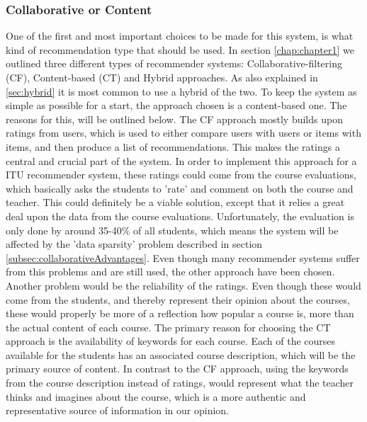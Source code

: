 \subsubsection*{Collaborative or Content}
One of the first and most important choices to be made for this system, is what kind of recommendation type that should be used. In section \ref{chap:chapter1} we outlined three different types of recommender systems: Collaborative-filtering (CF), Content-based (CT) and Hybrid approaches. As also explained in \ref{sec:hybrid} it is most common to use a hybrid of the two. To keep the system as simple as possible for a start, the approach chosen is a content-based one. The reasons for this, will be outlined below. \newline
The CF approach mostly builds upon ratings from users, which is used to either compare users with users or items with items, and then produce a list of recommendations. This makes the ratings a central and crucial part of the system. In order to implement this approach for a ITU recommender system, these ratings could come from the course evaluations, which basically asks the students to 'rate' and comment on both the course and teacher. This could definitely be a viable solution, except that it relies a great deal upon the data from the course evaluations. Unfortunately, the evaluation is only done by around 35-40\% of all students, which means the system will be affected by the 'data sparsity' problem described in section \ref{subsec:collaborativeAdvantages}. Even though many recommender systems suffer from this problems and are still used, the other approach have been chosen.\newline 
Another problem would be the reliability of the ratings. Even though these would come from the students, and thereby represent their opinion about the courses, these would properly be more of a reflection how popular a course is, more than the actual content of each course.\newline 
The primary reason for choosing the CT approach is the availability of keywords for each course. Each of the courses available for the students has an associated course description, which will be the primary source of content. In contrast to the CF approach, using the keywords from the course description instead of ratings, would represent what the teacher thinks and imagines about the course, which is a more authentic and representative source of information in our opinion. 


